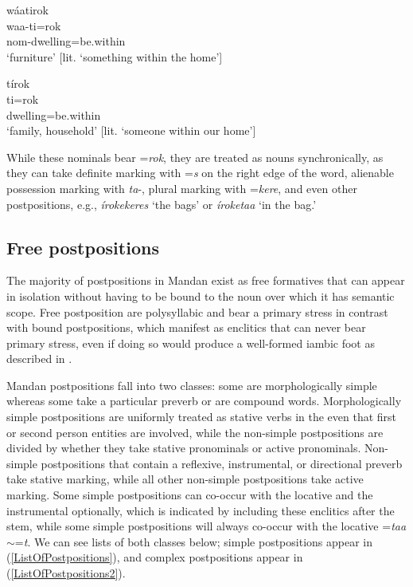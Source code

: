 \begin{exe}
\begin{xlist}
\item\label{ExamplesOfNominalRok7} \glll wáatirok\\
    waa-ti=rok\\
    nom-\textnormal{dwelling}=\textnormal{be.within}\\
    \glt `furniture' [lit. `something within the home']

\item\label{ExamplesOfNominalRok8} \glll tírok\\
    ti=rok\\
    \textnormal{dwelling}=\textnormal{be.within}\\
    \glt `family, household' [lit. `someone within our home']

\end{xlist}
 
\end{exe}

\newpage
While these nominals bear =\textit{rok}, they are treated as nouns synchronically, as they can take definite marking with =\textit{s} on the right edge of the word, alienable possession marking with \textit{ta}-, plural marking with =\textit{kere}, and even other postpositions, e.g., \textit{írokekeres} `the bags' or \textit{íroketaa} `in the bag.'
 
\subsection{Free postpositions}\label{SubSecFreePostpositions}

The majority of postpositions in Mandan exist as free formatives that can appear in isolation without having to be bound to the noun over which it has semantic scope. Free postposition are polysyllabic and bear a primary stress in contrast with bound postpositions, which manifest as enclitics that can never bear primary stress, even if doing so would produce a well-formed iambic foot as described in .

Mandan postpositions fall into two classes: some are morphologically simple whereas some take a particular preverb or are compound words. Morphologically simple postpositions are uniformly treated as stative verbs in the even that first or second person entities are involved, while the non-simple postpositions are divided by whether they take stative pronominals or active pronominals. Non-simple postpositions that contain a reflexive, instrumental, or directional preverb take stative marking, while all other non-simple postpositions take active marking. Some simple postpositions can co-occur with the locative and the instrumental optionally, which is indicated by including these enclitics after the stem, while some simple postpositions will always co-occur with the locative =\textit{taa}$\sim$=\textit{t}. We can see lists of both classes below; simple postpositions appear in (\ref{ListOfPostpositions}), and complex postpositions appear in (\ref{ListOfPostpositions2}).  

